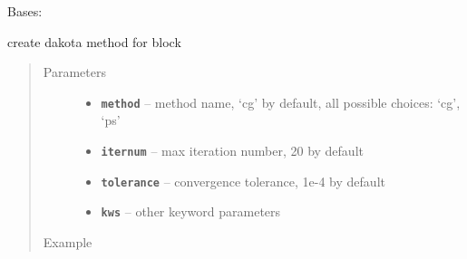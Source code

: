 \documentclass[letterpaper,10pt,english]{sphinxmanual}
\begin{document}
\begin{fulllineitems}
\label{src/apidocs/dakutils:genopt.dakutils.DakotaMethod}
Bases: \href{https://docs.python.org/2/library/functions.html\#object}{}

create dakota method for  block
\begin{quote}\begin{description}
\item[{Parameters}] \leavevmode\begin{itemize}
\item {} 
\textbf{\texttt{method}} -- method name, `cg' by default, all possible choices: `cg', `ps'

\item {} 
\textbf{\texttt{iternum}} -- max iteration number, 20 by default

\item {} 
\textbf{\texttt{tolerance}} -- convergence tolerance, 1e-4 by default

\item {} 
\textbf{\texttt{kws}} -- other keyword parameters

\end{itemize}

\item[{Example}] \leavevmode
\end{description}\end{quote}


\end{fulllineitems}
\end{document}
